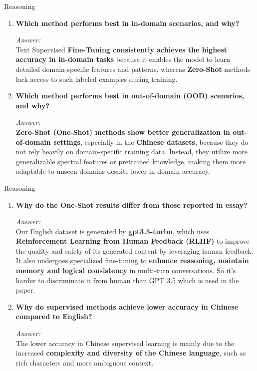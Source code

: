 \documentclass[serif]{beamer}
\begin{document}
\begin{frame}{Reasoning}
\small
\begin{enumerate}
    \item \textbf{Which method performs best in in-domain scenarios, and why?}
    
    \textit{Answer:} \\
   Text Supervised \textbf{Fine-Tuning consistently achieves the highest accuracy in in-domain tasks} because it enables the model to learn detailed domain-specific features and patterns, whereas \textbf{Zero-Shot} methods lack access to such labeled examples during training.


    \vspace{0.3cm}
    \item \textbf{Which method performs best in out-of-domain (OOD) scenarios, and why?}
    
    \textit{Answer:} \\
    \textbf{Zero-Shot (One-Shot) methods show better generalization in out-of-domain settings}, especially in the \textbf{Chinese datasets}, because they do not rely heavily on domain-specific training data. Instead, they utilize more generalizable spectral features or pretrained knowledge, making them more adaptable to unseen domains despite lower in-domain accuracy.

    \vspace{0.3cm}
 
\end{enumerate}
\end{frame}
\begin{frame}{Reasoning}
\small
\begin{enumerate}
   \item \textbf{Why do the One-Shot results differ from those reported in essay?}
    
    \textit{Answer:} \\
 Our English dataset is generated by \textbf{gpt3.5-turbo}, which uses \textbf{Reinforcement Learning from Human Feedback (RLHF)} to improve the quality and safety of its generated content by leveraging human feedback. It also undergoes specialized fine-tuning to \textbf{enhance reasoning,  maintain memory and logical consistency} in multi-turn conversations. So it's harder to discriminate it from human than GPT 3.5 which is used in the paper.
    \vspace{0.3cm}
    \item \textbf{Why do supervised methods achieve lower accuracy in Chinese compared to English?}
    
    \textit{Answer:} \\
    The lower accuracy in Chinese supervised learning is mainly due to the increased \textbf{complexity and diversity of the Chinese language}, such as rich characters and more ambiguous context. 
    \end{enumerate}
\end{frame}
\end{document}
